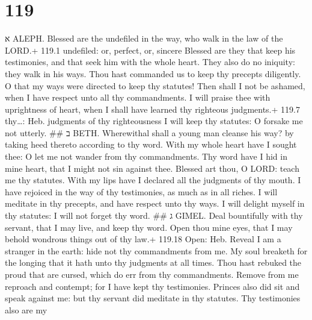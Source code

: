 \hypertarget{section-118}{%
\subsection{}\label{section-118}}

\hypertarget{section-119}{%
\section{119}\label{section-119}}

א ALEPH.  Blessed are the undefiled in the way, who walk in
the law of the LORD.+ 119.1 undefiled: or, perfect, or, sincere
 Blessed are they that keep his testimonies, and that seek
him with the whole heart.  They also do no iniquity: they
walk in his ways.  Thou hast commanded us to keep thy
precepts diligently.  O that my ways were directed to keep
thy statutes!  Then shall I not be ashamed, when I have
respect unto all thy commandments.  I will praise thee with
uprightness of heart, when I shall have learned thy righteous
judgments.+ 119.7 thy\ldots: Heb. judgments of thy righteousness
 I will keep thy statutes: O forsake me not utterly. \#\# ב
BETH.  Wherewithal shall a young man cleanse his way? by
taking heed thereto according to thy word.  With my whole
heart have I sought thee: O let me not wander from thy commandments.
 Thy word have I hid in mine heart, that I might not sin
against thee.  Blessed art thou, O LORD: teach me thy
statutes.  With my lips have I declared all the judgments
of thy mouth.  I have rejoiced in the way of thy
testimonies, as much as in all riches.  I will meditate in
thy precepts, and have respect unto thy ways.  I will
delight myself in thy statutes: I will not forget thy word. \#\# ג
GIMEL.  Deal bountifully with thy servant, that I may live,
and keep thy word.  Open thou mine eyes, that I may behold
wondrous things out of thy law.+ 119.18 Open: Heb. Reveal 
I am a stranger in the earth: hide not thy commandments from me.
 My soul breaketh for the longing that it hath unto thy
judgments at all times.  Thou hast rebuked the proud that
are cursed, which do err from thy commandments.  Remove
from me reproach and contempt; for I have kept thy testimonies.
 Princes also did sit and speak against me: but thy servant
did meditate in thy statutes.  Thy testimonies also are my
